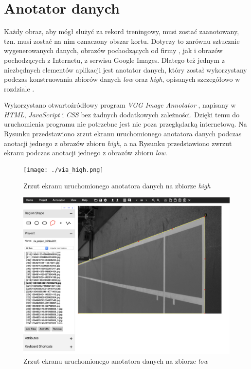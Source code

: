 \newpage
\section{Anotator danych}
\label{sec:anotator}

Każdy obraz, aby mógł służyć za rekord treningowy, musi zostać zaanotowany, tzn. musi zostać na nim oznaczony obszar kortu.
Dotyczy to zarównu sztucznie wygenerowanych danych, obrazów pochodzących od firmy \blue{}, jak i obrazów pochodzących z Internetu, z serwisu Google Images.
Dlatego też jednym z niezbędnych elementów aplikacji jest anotator danych, który został wykorzystany podczas konstruowania zbiorów danych \textit{low} oraz \textit{high}, opisanych szczegółowo w rozdziale .

Wykorzystano otwartoźródłowy program \textit{VGG Image Annotator} \cite{dutta2016via} \cite{dutta2019vgg}, napisany w \textit{HTML}, \textit{JavaScript} i \textit{CSS} bez żadnych dodatkowych zależności.
Dzięki temu do uruchomienia programu nie potrzebne jest nic poza przeglądarką internetową.
Na Rysunku  przedstawiono zrzut ekranu uruchomionego anotatora danych podczas anotacji jednego z obrazów zbioru \textit{high}, a na Rysunku  przedstawiono zwrzut ekranu podczas anotacji jednego z obrazów zbioru \textit{low}.

\vspace{1cm}

\begin{figure}[!htb]
  \texttt{[image: ./via\_high.png]}
    \caption{Zrzut ekranu uruchomionego anotatora danych na zbiorze \textit{high}}
    \label{fig:viahigh}
\end{figure}

\begin{figure}[!htb]
  \includegraphics[width=\linewidth]{./via_low.png}
    \caption{Zrzut ekranu uruchomionego anotatora danych na zbiorze \textit{low}}
    \label{fig:vialow}
\end{figure}
